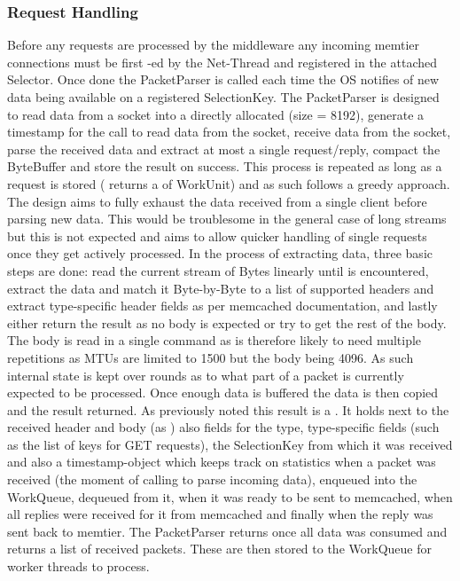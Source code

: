     \subsubsection{Request Handling}
        Before any requests are processed by the middleware any incoming memtier connections must be first
        -ed by the Net-Thread and registered in the attached Selector. Once done the PacketParser is called
        each time the OS notifies of new data being available on a registered SelectionKey. The PacketParser is designed
        to read data from a socket into a directly allocated  (size = \SI{8192}{\byte}), generate a
        timestamp for the call to read data from the socket, receive data from the socket, parse the received data and
        extract at most a single request/reply, compact the ByteBuffer and store the result on success. This process is
        repeated as long as a request is stored (\textrightarrow{} returns a  of WorkUnit) and as such follows a
        greedy approach. The design aims to fully exhaust the data received from a single client before parsing new
        data. This would be troublesome in the general case of long streams but this is not expected and aims to allow
        quicker handling of single requests once they get actively processed. In the process of extracting data, three
        basic steps are done: read the current stream of Bytes linearly until  is
        encountered, extract the data and match it Byte-by-Byte to a list of supported headers and extract type-specific
        header fields as per memcached documentation, and lastly either return the result as no body is expected or try
        to get the rest of the body. The body is read in a single command as is therefore likely to need multiple
        repetitions as MTUs are limited to \SI{1500}{\byte} but the body being \SI{4096}{\byte}. As such internal
        state is kept over rounds as to what part of a packet is currently expected to be processed. Once enough data is
        buffered the data is then copied and the result returned. As previously noted this result is a . It
        holds next to the received header and body (as ) also fields for the type, type-specific fields (such
        as the list of keys for GET requests), the SelectionKey from which it was received and also a timestamp-object
        which keeps track on statistics when a packet was received (the moment of calling to parse incoming data),
        enqueued into the WorkQueue, dequeued from it, when it was ready to be sent to memcached, when all replies were
        received for it from memcached and finally when the reply was sent back to memtier.\newline
        The PacketParser returns once all data was consumed and returns a list of received packets. These are then
        stored to the WorkQueue for worker threads to process.

